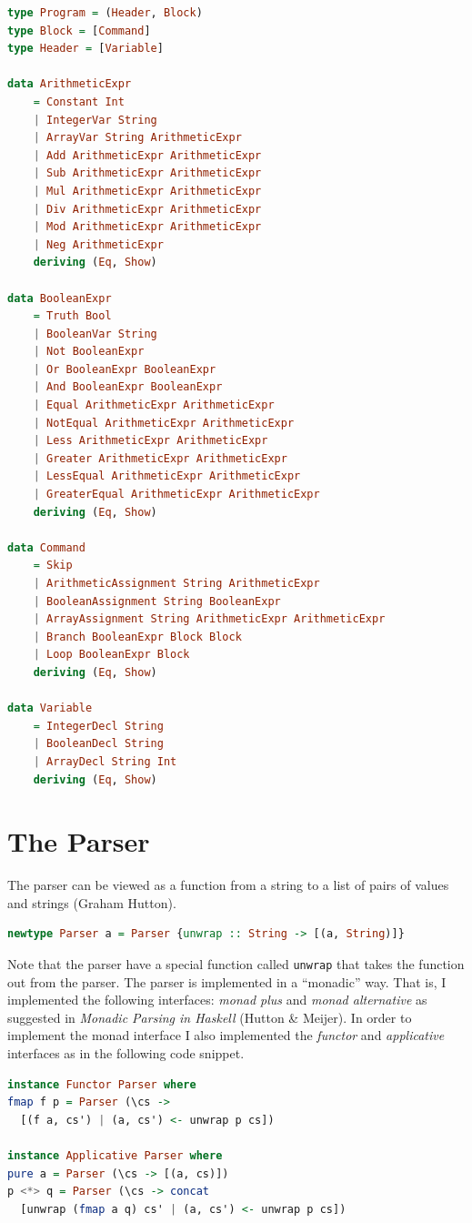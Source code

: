 \documentclass[12pt,a4paper]{article}
\begin{document}
\begin{lstlisting}[language=Haskell, style=custom-style]
type Program = (Header, Block)
type Block = [Command]
type Header = [Variable]

data ArithmeticExpr
    = Constant Int
    | IntegerVar String
    | ArrayVar String ArithmeticExpr
    | Add ArithmeticExpr ArithmeticExpr
    | Sub ArithmeticExpr ArithmeticExpr
    | Mul ArithmeticExpr ArithmeticExpr
    | Div ArithmeticExpr ArithmeticExpr
    | Mod ArithmeticExpr ArithmeticExpr
    | Neg ArithmeticExpr
    deriving (Eq, Show)

data BooleanExpr
    = Truth Bool
    | BooleanVar String
    | Not BooleanExpr
    | Or BooleanExpr BooleanExpr
    | And BooleanExpr BooleanExpr
    | Equal ArithmeticExpr ArithmeticExpr
    | NotEqual ArithmeticExpr ArithmeticExpr
    | Less ArithmeticExpr ArithmeticExpr
    | Greater ArithmeticExpr ArithmeticExpr
    | LessEqual ArithmeticExpr ArithmeticExpr
    | GreaterEqual ArithmeticExpr ArithmeticExpr
    deriving (Eq, Show)

data Command
    = Skip
    | ArithmeticAssignment String ArithmeticExpr
    | BooleanAssignment String BooleanExpr
    | ArrayAssignment String ArithmeticExpr ArithmeticExpr
    | Branch BooleanExpr Block Block
    | Loop BooleanExpr Block
    deriving (Eq, Show)

data Variable
    = IntegerDecl String
    | BooleanDecl String
    | ArrayDecl String Int
    deriving (Eq, Show)
\end{lstlisting}

\section*{The Parser}
The parser can be viewed as a function from a string to a list of pairs of values and strings (Graham Hutton).
\begin{lstlisting}[language=Haskell, style=custom-style]
newtype Parser a = Parser {unwrap :: String -> [(a, String)]}
\end{lstlisting}
Note that the parser have a special function called \texttt{unwrap} that takes the function out from the parser.
The parser is implemented in a ``monadic'' way.
That is, I implemented the following interfaces: \textit{monad plus} and \textit{monad alternative} as suggested in \textit{Monadic Parsing in Haskell} (Hutton \& Meijer).
In order to implement the monad interface I also implemented the \textit{functor} and \textit{applicative} interfaces as in the following code snippet.
\begin{lstlisting}[language=Haskell, style=custom-style]
instance Functor Parser where
fmap f p = Parser (\cs ->
  [(f a, cs') | (a, cs') <- unwrap p cs])

instance Applicative Parser where
pure a = Parser (\cs -> [(a, cs)])
p <*> q = Parser (\cs -> concat
  [unwrap (fmap a q) cs' | (a, cs') <- unwrap p cs])
\end{lstlisting}
\end{document}
